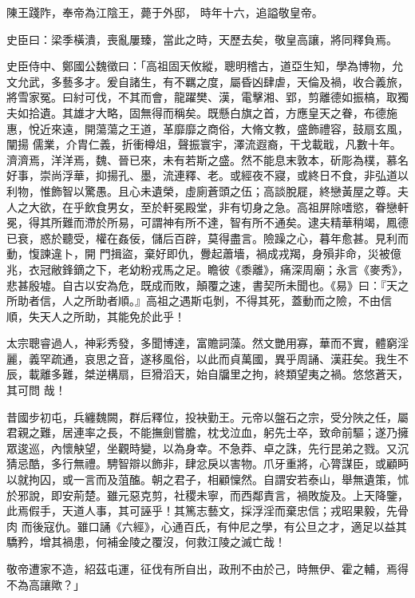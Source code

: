 \begin{pinyinscope}
 陳王踐阼，奉帝為江陰王，薨于外邸，
 時年十六，追謚敬皇帝。



 史臣曰：梁季橫潰，喪亂屢臻，當此之時，天歷去矣，敬皇高讓，將同釋負焉。



 史臣侍中、鄭國公魏徵曰：「高祖固天攸縱，聰明稽古，道亞生知，學為博物，允文允武，多藝多才。爰自諸生，有不羈之度，屬昏凶肆虐，天倫及禍，收合義旅，將雪家冤。曰紂可伐，不其而會，龍躍樊、漢，電擊湘、郢，剪離德如振槁，取獨夫如拾遺。其雄才大略，固無得而稱矣。既懸白旗之首，方應皇天之眷，布德施惠，悅近來遠，開蕩蕩之王道，革靡靡之商俗，大脩文教，盛飾禮容，鼓扇玄風，闡揚
 儒業，介胄仁義，折衝樽俎，聲振寰宇，澤流遐裔，干戈載戢，凡數十年。濟濟焉，洋洋焉，魏、晉已來，未有若斯之盛。然不能息末敦本，斫彫為樸，慕名好事，崇尚浮華，抑揚孔、墨，流連釋、老。或經夜不寢，或終日不食，非弘道以利物，惟飾智以驚愚。且心未遺榮，虛廁蒼頭之伍；高談脫屣，終戀黃屋之尊。夫人之大欲，在乎飲食男女，至於軒冕殿堂，非有切身之急。高祖屏除嗜慾，眷戀軒冕，得其所難而滯於所易，可謂神有所不達，智有所不通矣。逮夫精華稍竭，鳳德已衰，惑於聽受，權在姦佞，儲后百辟，莫得盡言。險躁之心，暮年愈甚。見利而動，愎諫違卜，開
 門揖盜，棄好即仇，釁起蕭墻，禍成戎羯，身殞非命，災被億兆，衣冠敝鋒鏑之下，老幼粉戎馬之足。瞻彼《黍離》，痛深周廟；永言《麥秀》，悲甚殷墟。自古以安為危，既成而敗，顛覆之速，書契所未聞也。《易》曰：『天之所助者信，人之所助者順。』高祖之遇斯屯剝，不得其死，蓋動而之險，不由信順，失天人之所助，其能免於此乎！



 太宗聰睿過人，神彩秀發，多聞博達，富贍詞藻。然文艷用寡，華而不實，體窮淫麗，義罕疏通，哀思之音，遂移風俗，以此而貞萬國，異乎周誦、漢莊矣。我生不辰，載離多難，桀逆構扇，巨猾滔天，始自牖里之拘，終類望夷之禍。悠悠蒼天，其可問
 哉！



 昔國步初屯，兵纏魏闕，群后釋位，投袂勤王。元帝以盤石之宗，受分陜之任，屬君親之難，居連率之長，不能撫劍嘗膽，枕戈泣血，躬先士卒，致命前驅；遂乃擁眾逡巡，內懷觖望，坐觀時變，以為身幸。不急莽、卓之誅，先行昆弟之戮。又沉猜忌酷，多行無禮。騁智辯以飾非，肆忿戾以害物。爪牙重將，心膂謀臣，或顧眄以就拘囚，或一言而及菹醢。朝之君子，相顧懍然。自謂安若泰山，舉無遺策，怵於邪說，即安荊楚。雖元惡克剪，社稷未寧，而西鄰責言，禍敗旋及。上天降鑒，此焉假手，天道人事，其可誣乎！其篤志藝文，採浮淫而棄忠信；戎昭果毅，先骨肉
 而後寇仇。雖口誦《六經》，心通百氏，有仲尼之學，有公旦之才，適足以益其驕矜，增其禍患，何補金陵之覆沒，何救江陵之滅亡哉！



 敬帝遭家不造，紹茲屯運，征伐有所自出，政刑不由於己，時無伊、霍之輔，焉得不為高讓歟？」



\end{pinyinscope}